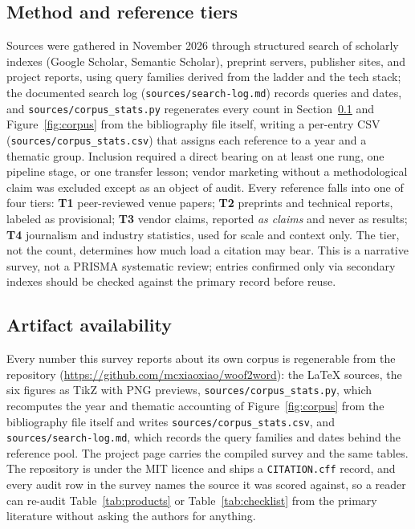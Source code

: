 \subsection{Method and reference tiers}
\label{sec:method}
Sources were gathered in November 2026 through structured search of
scholarly indexes (Google Scholar, Semantic Scholar), preprint servers,
publisher sites, and project reports, using query families derived from the
ladder and the tech stack; the documented search log
(\texttt{sources/search-log.md}) records queries and dates, and
\texttt{sources/corpus\_stats.py} regenerates every count in
Section~\ref{sec:method} and Figure~\ref{fig:corpus} from the bibliography
file itself, writing a per-entry CSV (\texttt{sources/corpus\_stats.csv}) that
assigns each reference to a year and a thematic group. Inclusion
required a direct bearing on at least one rung, one pipeline stage, or one
transfer lesson; vendor marketing without a methodological claim was
excluded except as an object of audit. Every reference falls into one of
four tiers: \textbf{T1} peer-reviewed venue papers; \textbf{T2} preprints
and technical reports, labeled as provisional; \textbf{T3} vendor claims,
reported \emph{as claims} and never as results; \textbf{T4} journalism and
industry statistics, used for scale and context only. The tier, not the
count, determines how much load a citation may bear. This is a narrative
survey, not a PRISMA systematic review; entries confirmed only via
secondary indexes should be checked against the primary record before
reuse.

\subsection{Artifact availability}
Every number this survey reports about its own corpus is regenerable from the
repository (\url{https://github.com/mcxiaoxiao/woof2word}): the \LaTeX{}
sources, the six figures as TikZ with PNG previews,
\texttt{sources/corpus\_stats.py}, which recomputes the year and thematic
accounting of Figure~\ref{fig:corpus} from the bibliography file itself and
writes \texttt{sources/corpus\_stats.csv}, and
\texttt{sources/search-log.md}, which records the query families and dates
behind the reference pool. The project page carries the compiled survey and the
same tables. The repository is under the MIT licence and ships a
\texttt{CITATION.cff} record, and every audit row in the survey names the
source it was scored against, so a reader can re-audit Table~\ref{tab:products}
or Table~\ref{tab:checklist} from the primary literature without asking the
authors for anything.

